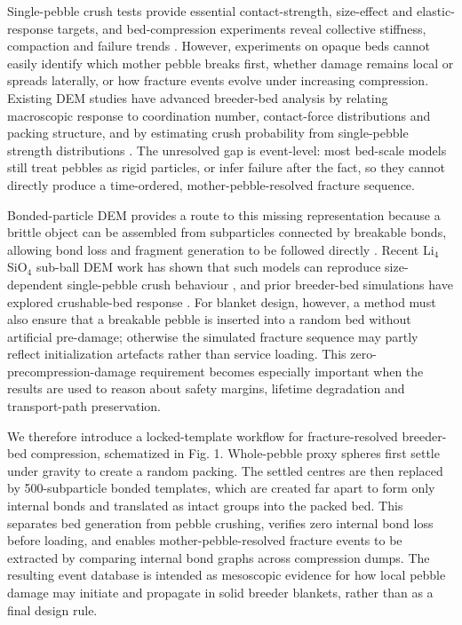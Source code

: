 \documentclass[10pt,twocolumn]{article}
\begin{document}
Single-pebble crush tests provide essential contact-strength, size-effect and elastic-response targets, and bed-compression experiments reveal collective stiffness, compaction and failure trends \cite{PlateMaterialLi4SiO4,Annabattula2014SizeDependentCrush,Bhartia2020ElasticResponse,ZaccariLoFrano2009CeramicPebbleBeds}. However, experiments on opaque beds cannot easily identify which mother pebble breaks first, whether damage remains local or spreads laterally, or how fracture events evolve under increasing compression. Existing DEM studies have advanced breeder-bed analysis by relating macroscopic response to coordination number, contact-force distributions and packing structure, and by estimating crush probability from single-pebble strength distributions \cite{An2007DEMCeramicBreederBeds,GanKamlah2010DEMPebbleBeds,CrushProbabilityPebbleBed2011,Wang2021CrushableCeramicPebbleBed}. The unresolved gap is event-level: most bed-scale models still treat pebbles as rigid particles, or infer failure after the fact, so they cannot directly produce a time-ordered, mother-pebble-resolved fracture sequence.


Bonded-particle DEM provides a route to this missing representation because a brittle object can be assembled from subparticles connected by breakable bonds, allowing bond loss and fragment generation to be followed directly \cite{PotyondyCundall2004}. Recent Li$_4$SiO$_4$ sub-ball DEM work has shown that such models can reproduce size-dependent single-pebble crush behaviour \cite{Li4SiO4SizeDEM2023}, and prior breeder-bed simulations have explored crushable-bed response \cite{Wang2021CrushableCeramicPebbleBed,CrushableDEMPebbleBed2026}. For blanket design, however, a method must also ensure that a breakable pebble is inserted into a random bed without artificial pre-damage; otherwise the simulated fracture sequence may partly reflect initialization artefacts rather than service loading. This zero-precompression-damage requirement becomes especially important when the results are used to reason about safety margins, lifetime degradation and transport-path preservation.


We therefore introduce a locked-template workflow for fracture-resolved breeder-bed compression, schematized in Fig. 1. Whole-pebble proxy spheres first settle under gravity to create a random packing. The settled centres are then replaced by 500-subparticle bonded templates, which are created far apart to form only internal bonds and translated as intact groups into the packed bed. This separates bed generation from pebble crushing, verifies zero internal bond loss before loading, and enables mother-pebble-resolved fracture events to be extracted by comparing internal bond graphs across compression dumps. The resulting event database is intended as mesoscopic evidence for how local pebble damage may initiate and propagate in solid breeder blankets, rather than as a final design rule.
\end{document}
